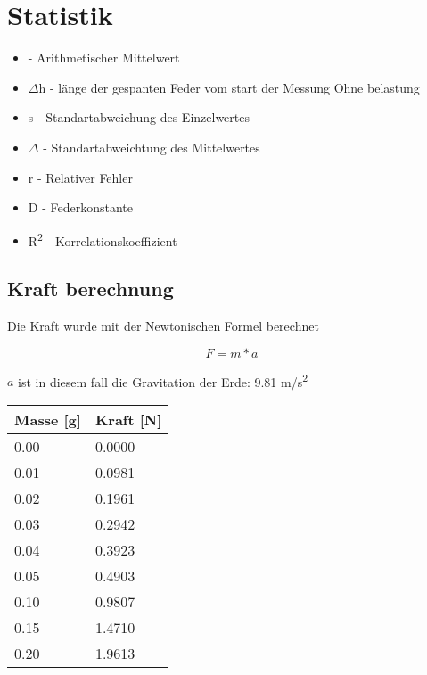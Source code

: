 \documentclass[../main.tex]{subfiles} %
\begin{document}
\chapter{Statistik}\label{ch:statistik}

\begin{itemize}
    \item {} - Arithmetischer Mittelwert
    \item $\Delta$h - länge der gespanten Feder vom start der Messung Ohne belastung
    \item s - Standartabweichung des Einzelwertes
    \item $\Delta$ - Standartabweichtung des Mittelwertes
    \item r - Relativer Fehler
    \item D - Federkonstante
    \item R\textsuperscript{2} - Korrelationskoeffizient
\end{itemize}

\section{Kraft berechnung}\label{sec:force-calculation}

Die Kraft wurde mit der Newtonischen Formel berechnet

$$ F = m * a $$

$a$ ist in diesem fall die Gravitation der Erde: 9.81 m/s\textsuperscript{2}

\begin{center}
    \begin{tabular}{ |l|l| } \hline\rowcolor{Gray!50}
        Masse [g] & Kraft [N] \\\hline
        0.00      & 0.0000    \\\hline
        0.01      & 0.0981    \\\hline
        0.02      & 0.1961    \\\hline
        0.03      & 0.2942    \\\hline
        0.04      & 0.3923    \\\hline
        0.05      & 0.4903    \\\hline
        0.10      & 0.9807    \\\hline
        0.15      & 1.4710    \\\hline
        0.20      & 1.9613    \\\hline
    \end{tabular}
\end{center}
\end{document}

